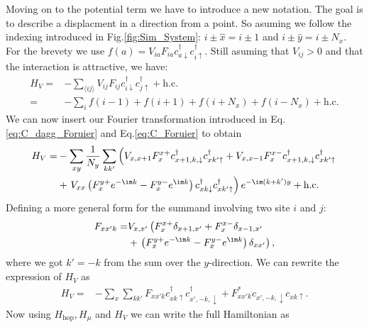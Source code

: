\documentclass[../main.tex]{subfile}
\begin{document}
Moving on to the potential term we have to introduce a new notation. The goal is to describe a displacment in a direction from a point. So asuming
we follow the indexing introduced in Fig.\ref{fig:Sim_System}: $i\pm\hat{x} = i\pm 1$ and $i\pm\hat{y} = i\pm N_x$.
For the brevety we use $f(a) = V_{ia}F_{ia} c^{\dagger}_{a\downarrow} c^{\dagger}_{i\uparrow}$. Still asuming that $V_{ij}>0$ and that the interaction is attractive, we have: 
\begin{align*}
    H_V =& -\sum_{\langle ij\rangle} V_{ij} F_{ij} c^{\dagger}_{i\downarrow} c^{\dagger}_{j\uparrow} + \text{h.c.} \\
    =& -\sum_{i} f(i-1) + f(i+1) + f(i+N_x) + f(i-N_x) + \text{h.c.}
\end{align*}
We can now insert our Fourier transformation introduced in Eq.\ref{eq:C_dagg_Foruier} and Eq.\ref{eq:C_Foruier} to obtain
\begin{align*}
    H_V =& -\sum_{xy} \frac{1}{N_y} \sum_{kk'} \left( V_{x,x+1} F_{x}^{x+} c^{\dagger}_{x+1,k,\downarrow}c^{\dagger}_{xk'\uparrow} + V_{x,x-1} F_{x}^{x-} c^{\dagger}_{x+1,k,\downarrow} c^{\dagger}_{xk'\uparrow} \right.\\
        &+ \left.V_{xx}\left( F_{x}^{y+} e^{-\im k}  - F_{x}^{y-} e^{\im k}\right) c^{\dagger}_{xk\downarrow} c^{\dagger}_{xk'\uparrow} \right) e^{-\im(k + k')y} + \text{h.c.}\\
\end{align*}
Defining a more general form for the summand involving two site $i$ and $j$:
\begin{equation*}
    \begin{aligned}
    F_{xx'k} =&  V_{x,x'}\left( F_{x}^{x+} \delta_{x+1,x'} +  F_{x}^{x-} \delta_{x-1,x'}\right. \\
        &+ \left.\left( F_{x}^{y+} e^{-\im k}  - F_{x}^{y-} e^{\im k}\right)\delta_{xx'}\right),
    \end{aligned}
\end{equation*} 
where we got $k' = -k$ from the sum over the $y$-direction. We can rewrite the expression of $H_V$ as
\begin{align*}
    H_V =& -\sum_{x} \sum_{kk'} F_{xx'k} c^{\dagger}_{xk\uparrow} c^{\dagger}_{x',-k,\downarrow} + F_{xx'k}^{\ast} c_{x',-k,\downarrow} c_{xk\uparrow}.
\end{align*}
Now using $H_{\text{hop}}, H_{\mu}$ and $H_{V}$ we can write the full Hamiltonian as 
\end{document}
